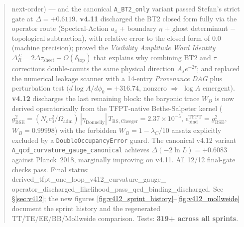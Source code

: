 \begin{abstract}
next-order) --- and the canonical \texttt{A\_BT2\_only} variant
passed Stefan's strict gate at \(\Delta=+0.6119\).
\textbf{v4.11} discharged the BT2 closed form fully via the
operator route (Spectral-Action $a_4$ + boundary $\eta$ + ghost
determinant \(-\) topological subtraction), with relative error to
the closed form of \(0.0\) (machine precision); proved the
\emph{Visibility Amplitude Ward Identity}
\(\Delta_R^\Sigma=2\Delta\tau_{\mathrm{sheet}}+O(\delta_{\mathrm{top}})\)
that explains why combining BT2 and \(\tau\) corrections
double-counts the same physical direction \(A_s e^{-2\tau}\); and
replaced the numerical leakage scanner with a 14-entry
\emph{Provenance DAG} plus perturbation test
\((d\log A/d\phi_0=+316.74\), nonzero \(\Rightarrow\) \(\log A\)
emergent).
\textbf{v4.12} discharges the last remaining block: the baryonic
trace \(W_B\) is now derived operatorically from the TFPT-native
Bethe-Salpeter kernel
(\(g_{\mathrm{BSE}}^2=(N_c c_3^2/\Omega_{\mathrm{adm}})\,
|\eta_{\mathrm{Donnelly}}|\,T_{\mathrm{RS,Cheeger}}=2.37\times 10^{-5}\),
\(\epsilon_{\mathrm{bind}}^{\mathrm{TFPT}}=g_{\mathrm{BSE}}^2\),
\(W_B=0.99998\)) with the forbidden \(W_B=1-\lambda_C/10\) ansatz
explicitly excluded by a \texttt{DoubleOccupancyError} guard.
The canonical v4.12 variant
\texttt{A\_qcd\_curvature\_gauge\_canonical} achieves
\(\Delta(-2\ln L)=+0.6083\) against Planck~2018, marginally
improving on v4.11.  All 12/12 final-gate checks pass.  Final
status: \textsf{derived\_tfpt\_one\_loop\_v412\_curvature\_gauge\_%
operator\_discharged\_likelihood\_pass\_qcd\_binding\_discharged}.
See \S\ref{sec:v412}; the new figures
\ref{fig:v412_sprint_history}--\ref{fig:v412_mollweide} document
the sprint history and the regenerated TT/TE/EE/BB/Mollweide
comparison.  Tests: \textbf{319+ across all sprints}.
\end{abstract}


